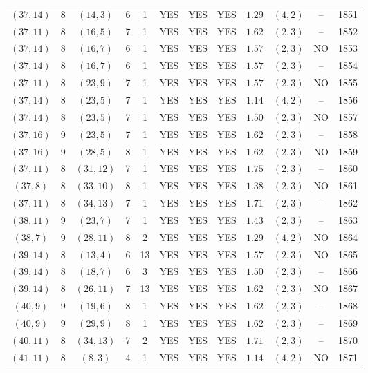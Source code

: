 \begin{longtable}{|c|c|c|c|c|c|c|c|c|c|c|c|}
$(37,14)$ & 8 & $(14,3)$ & 6 & 1 & YES & YES & YES & $1.29$ & $(4,2)$ & -- & 1851\\
$(37,11)$ & 8 & $(16,5)$ & 7 & 1 & YES & YES & YES & $1.62$ & $(2,3)$ & -- & 1852\\
$(37,14)$ & 8 & $(16,7)$ & 6 & 1 & YES & YES & YES & $1.57$ & $(2,3)$ & NO & 1853\\
$(37,14)$ & 8 & $(16,7)$ & 6 & 1 & YES & YES & YES & $1.57$ & $(2,3)$ & -- & 1854\\
$(37,11)$ & 8 & $(23,9)$ & 7 & 1 & YES & YES & YES & $1.57$ & $(2,3)$ & NO & 1855\\
$(37,14)$ & 8 & $(23,5)$ & 7 & 1 & YES & YES & YES & $1.14$ & $(4,2)$ & -- & 1856\\
$(37,14)$ & 8 & $(23,5)$ & 7 & 1 & YES & YES & YES & $1.50$ & $(2,3)$ & NO & 1857\\
$(37,16)$ & 9 & $(23,5)$ & 7 & 1 & YES & YES & YES & $1.62$ & $(2,3)$ & -- & 1858\\
$(37,16)$ & 9 & $(28,5)$ & 8 & 1 & YES & YES & YES & $1.62$ & $(2,3)$ & NO & 1859\\
$(37,11)$ & 8 & $(31,12)$ & 7 & 1 & YES & YES & YES & $1.75$ & $(2,3)$ & -- & 1860\\
$(37,8)$ & 8 & $(33,10)$ & 8 & 1 & YES & YES & YES & $1.38$ & $(2,3)$ & NO & 1861\\
$(37,11)$ & 8 & $(34,13)$ & 7 & 1 & YES & YES & YES & $1.71$ & $(2,3)$ & -- & 1862\\
$(38,11)$ & 9 & $(23,7)$ & 7 & 1 & YES & YES & YES & $1.43$ & $(2,3)$ & -- & 1863\\
$(38,7)$ & 9 & $(28,11)$ & 8 & 2 & YES & YES & YES & $1.29$ & $(4,2)$ & NO & 1864\\
$(39,14)$ & 8 & $(13,4)$ & 6 & 13 & YES & YES & YES & $1.57$ & $(2,3)$ & NO & 1865\\
$(39,14)$ & 8 & $(18,7)$ & 6 & 3 & YES & YES & YES & $1.50$ & $(2,3)$ & -- & 1866\\
$(39,14)$ & 8 & $(26,11)$ & 7 & 13 & YES & YES & YES & $1.62$ & $(2,3)$ & NO & 1867\\
$(40,9)$ & 9 & $(19,6)$ & 8 & 1 & YES & YES & YES & $1.62$ & $(2,3)$ & -- & 1868\\
$(40,9)$ & 9 & $(29,9)$ & 8 & 1 & YES & YES & YES & $1.62$ & $(2,3)$ & -- & 1869\\
$(40,11)$ & 8 & $(34,13)$ & 7 & 2 & YES & YES & YES & $1.71$ & $(2,3)$ & -- & 1870\\
$(41,11)$ & 8 & $(8,3)$ & 4 & 1 & YES & YES & YES & $1.14$ & $(4,2)$ & NO & 1871\\

\end{longtable}
